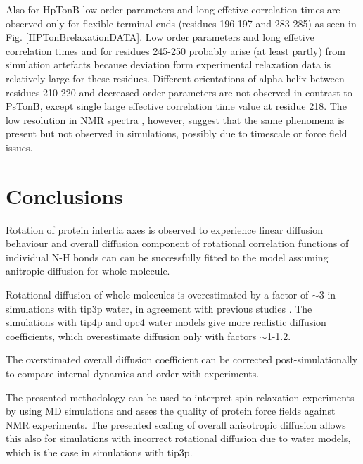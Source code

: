 \documentclass[pre,aps,floatfix,authordate1-4,twocolumn]{revtex4-1}
\begin{document}
Also for HpTonB low order parameters and long effetive correlation times
are observed only for flexible terminal ends (residues 196-197 and 283-285)
as seen in Fig. \ref{HPTonBrelaxationDATA}. Low order parameters and long
effetive correlation times and for residues 245-250 probably arise
(at least partly) from simulation artefacts because deviation form experimental
relaxation data is relatively large for these residues.
Different orientations of alpha helix between residues 210-220 and
decreased order parameters are not observed in contrast to PsTonB,
except single large effective correlation time value at residue 218.
The low resolution in NMR spectra \cite{??}, however, suggest that
the same phenomena is present but not observed in simulations, possibly
due to timescale or force field issues.

\section{Conclusions}

Rotation of protein intertia axes is observed to experience linear
diffusion behaviour and overall diffusion component of rotational 
correlation functions of individual N-H bonds can can be successfully 
fitted to the model assuming anitropic diffusion for whole molecule.

Rotational diffusion of whole molecules is overestimated by a factor
of $\sim$3 in simulations with tip3p water, in agreement with previous
studies \cite{??}. The simulations with tip4p and opc4 water models
give more realistic diffusion coefficients, which overestimate diffusion
only with factors $\sim$1-1.2. 

The overstimated overall diffusion
coefficient can be corrected post-simulationally to compare internal dynamics
and order with experiments. 

The presented methodology can be used to interpret spin relaxation experiments
by using MD simulations \cite{??} and asses the quality of protein force fields
against NMR experiments. The presented scaling of overall anisotropic diffusion
allows this also for simulations with incorrect rotational diffusion due to water
models, which is the case in simulations with tip3p. 

\begin{acknowledgments}
\end{acknowledgments}





\end{document}
